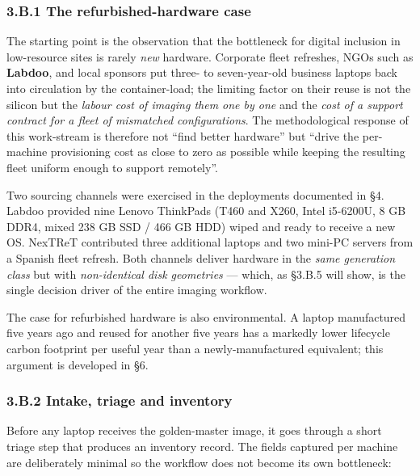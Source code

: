 \hypertarget{b.1-the-refurbished-hardware-case}{%
\subsubsection{3.B.1 The refurbished-hardware
case}\label{b.1-the-refurbished-hardware-case}}

The starting point is the observation that the bottleneck for digital
inclusion in low-resource sites is rarely \emph{new} hardware. Corporate
fleet refreshes, NGOs such as \textbf{Labdoo}, and local sponsors put
three- to seven-year-old business laptops back into circulation by the
container-load; the limiting factor on their reuse is not the silicon
but the \emph{labour cost of imaging them one by one} and the \emph{cost
of a support contract for a fleet of mismatched configurations}. The
methodological response of this work-stream is therefore not ``find
better hardware'' but ``drive the per-machine provisioning cost as close
to zero as possible while keeping the resulting fleet uniform enough to
support remotely''.

Two sourcing channels were exercised in the deployments documented in
§4. Labdoo provided nine Lenovo ThinkPads (T460 and X260, Intel
i5-6200U, 8 GB DDR4, mixed 238 GB SSD / 466 GB HDD) wiped and ready to
receive a new OS. NexTReT contributed three additional laptops and two
mini-PC servers from a Spanish fleet refresh. Both channels deliver
hardware in the \emph{same generation class} but with
\emph{non-identical disk geometries} --- which, as §3.B.5 will show, is
the single decision driver of the entire imaging workflow.

The case for refurbished hardware is also environmental. A laptop
manufactured five years ago and reused for another five years has a
markedly lower lifecycle carbon footprint per useful year than a
newly-manufactured equivalent; this argument is developed in §6.

\hypertarget{b.2-intake-triage-and-inventory}{%
\subsubsection{3.B.2 Intake, triage and
inventory}\label{b.2-intake-triage-and-inventory}}

Before any laptop receives the golden-master image, it goes through a
short triage step that produces an inventory record. The fields captured
per machine are deliberately minimal so the workflow does not become its
own bottleneck:

